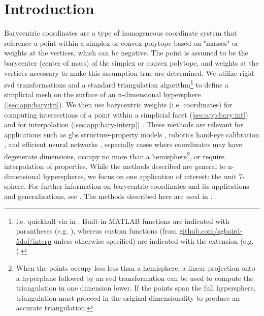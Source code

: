 \documentclass[final,12pt]{elsarticle}
\begin{document}
\section{Introduction}
Barycentric coordinates are a type of homogeneous coordinate system that reference a \outpt{} point within a simplex \cite{langerSphericalBarycentricCoordinates2006} or convex polytope \cite{floaterGeneralizedBarycentricCoordinates2015,meyerGeneralizedBarycentricCoordinates2002,langerSphericalBarycentricCoordinates2006} based on "masses" or weights at the vertices, which can be negative. The \outpt{} point is assumed to be the barycenter (center of mass) of the simplex or convex polytope, and weights at the vertices necessary to make this assumption true are determined. We utilize rigid \gls{svd} transformations and a standard triangulation algorithm\footnote{i.e. quickhull \cite{barberQuickhullAlgorithmConvex1996} via  in . Built-in MATLAB functions are indicated with parantheses (e.g. ), whereas custom functions (from \url{github.com/sgbaird-5dof/interp} unless otherwise specified) are indicated with the  extension (e.g. ). } to define a simplicial mesh on the surface of an n-dimensional hypersphere (\cref{sec:app:bary:tri}). We then use barycentric weights (i.e. coordinates) for computing intersections of a point within a simplicial facet (\cref{sec:app:bary:int}) and for interpolation (\cref{sec:app:bary-interp}) \cite{langerSphericalBarycentricCoordinates2006}. These methods are relevant for applications such as \glspl{gb} structure-property models \cite{chesserLearningGrainBoundary2020}, robotics hand-eye calibration \cite{wuHandEyeCalibration4D2020}, and efficient neural networks \cite{wuDeepOctonionNetworks2020}, especially cases where coordinates may have degenerate dimensions, occupy no more than a hemisphere\footnote{When the points occupy less less than a hemisphere, a linear projection onto a hyperplane followed by an \gls{svd} transformation can be used to compute the triangulation in one dimension lower. If the points span the full hypersphere, triangulation must proceed in the original dimensionality to produce an accurate triangulation. }, or require interpolation of properties. While the methods described are general to n-dimensional hyperspheres, we focus on one application of interest: the unit 7-sphere. For further information on barycentric coordinates and its applications and generalizations, see \cite{anisimovSubdividingBarycentricCoordinates2016,budninskiyPowerCoordinatesGeometric2016,dyerBarycentricCoordinateNeighbourhoods2016,floaterGeneralizedBarycentricCoordinates2015,floaterInjectivityWachspressMean2010,hormannDiscretizingWachspressKernels2017,hormannMaximumEntropyCoordinates2008,langerHigherOrderBarycentric2008,langerSphericalBarycentricCoordinates2006,leiNewCoordinateSystem2020,meyerGeneralizedBarycentricCoordinates2002,peixotoVectorFieldReconstructions2014,pihajokiBarycentricInterpolationRiemannian2019,rustamovBarycentricCoordinatesSurfaces2010,skalaRobustBarycentricCoordinates2013,taoFastNumericalSolver2019,warrenBarycentricCoordinatesConvex2007}. The methods described here are used in \cite{bairdFiveDegreeofFreedomProperty2021a}.
\end{document}
